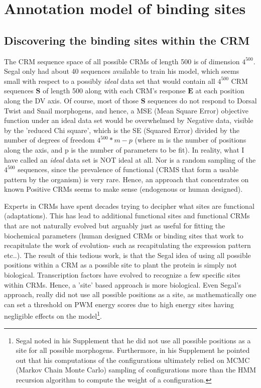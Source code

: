   
  \section{Annotation model of binding sites}
\subsection{Discovering the binding sites within the CRM}
The CRM sequence space of all possible CRMs of length 500 is of dimension $4^{500}$.  Segal only had about 40 sequences available to train his model, which seems small with respect to a possibly \emph{ideal} data set that would contain all $4^{500}$ CRM sequences $\textbf{S}$ of length 500 along with each CRM's response $\textbf{E}$ at each position along the DV axis.  Of course, most of those $\textbf{S}$ sequences do not respond to Dorsal Twist and Snail morphogens, and hence, a MSE (Mean Square Error) objective function under an ideal data set would be overwhelmed by Negative data, visible by the 'reduced Chi square', which  is the SE (Squared Error) divided by the number of degrees of freedom $4^{500} * m - p$ (where m is the number of positions along the axis, and p is the number of parameters to be fit).  In reality, what I have called an \emph{ideal} data set is NOT ideal at all.  Nor is a random sampling of the $4^{500}$ sequences, since the prevalence of functional (CRMS that form a usable pattern by the organism) is very rare.  Hence, an approach that concentrates on known Positive CRMs seems to make sense (endogenous or human designed).

Experts in CRMs have spent decades trying to decipher what sites are functional (adaptations).  This has lead to additional functional sites and functional CRMs that are not naturally evolved but arguably just as useful for fitting the biochemical parameters (human designed CRMs or binding sites that work to recapitulate the work of evolution- such as recapitulating the expression pattern etc..). The result of this tedious work, is that the Segal idea of using all possible positions within a CRM as a possible site to plant the protein is simply not biological.  Transcription factors have evolved to recognize a few specific sites within CRMs.  Hence, a 'site' based approach is more biological.  Even Segal's approach, really did not use all possible positions as a site, as mathematically one can set a threshold on PWM energy scores due to high energy sites having negligible effects on the model\footnote{Segal noted in his Supplement that he did not use all possible positions as a site for all possible morphogens.  Furthermore, in his Supplement he pointed out that his computations of the configurations ultimately relied on MCMC (Markov Chain Monte Carlo) sampling of configurations more than the HMM recursion algorithm to compute the weight of a configuration.}.  


